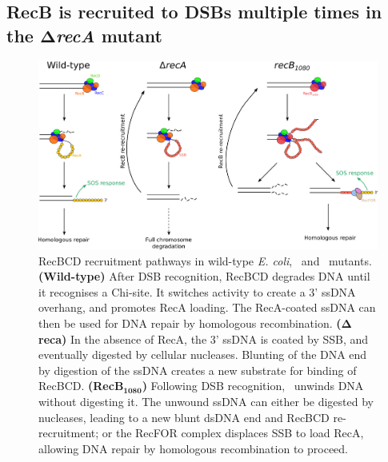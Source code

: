 \subsection*{RecB is recruited to DSBs multiple times in the $\mathbf{\Delta}$\emph{recA} mutant}

\begin{figure}[htbp]
    \centering
    \includegraphics[width=\textwidth]{Figures/Fig_mutants_pathways.pdf}
    \caption{RecBCD recruitment pathways in wild-type \emph{E. coli}, \dreca\ and \geneteneighty\ mutants. \textbf{(Wild-type)} After DSB recognition, RecBCD degrades DNA until it recognises a Chi-site. It switches activity to create a 3' ssDNA overhang, and promotes RecA loading. The RecA-coated ssDNA can then be used for DNA repair by homologous recombination. \textbf{($\mathbf{\Delta}$reca)} In the absence of RecA, the 3' ssDNA is coated by SSB, and eventually digested by cellular nucleases. Blunting of the DNA end by digestion of the ssDNA creates a new substrate for binding of RecBCD. \textbf{(RecB$\mathbf{_{1080}}$)} Following DSB recognition, \teneighty\ unwinds DNA without digesting it. The unwound ssDNA can either be digested by nucleases, leading to a new blunt dsDNA end and RecBCD re-recruitment; or the RecFOR complex displaces SSB to load RecA, allowing DNA repair by homologous recombination to proceed.}
    \label{Fig:pathways}
\end{figure}

